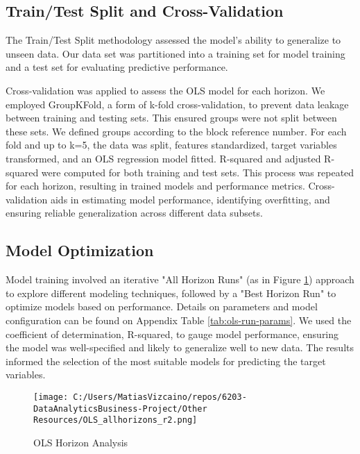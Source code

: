 \documentclass{article}
\begin{document}
\subsection{Train/Test Split and Cross-Validation}

The Train/Test Split methodology assessed the model's ability to generalize to unseen data. Our data set was partitioned into a training set for model training and a test set for evaluating predictive performance.

Cross-validation was applied to assess the OLS model for each horizon. We employed GroupKFold, a form of k-fold cross-validation, to prevent data leakage between training and testing sets. This ensured groups were not split between these sets. We defined groups according to the block reference number. For each fold and up to k=5, the data was split, features standardized, target variables transformed, and an OLS regression model fitted. R-squared and adjusted R-squared were computed for both training and test sets. This process was repeated for each horizon, resulting in trained models and performance metrics. Cross-validation aids in estimating model performance, identifying overfitting, and ensuring reliable generalization across different data subsets.

\subsection{Model Optimization}\label{sec:model-optimization}

Model training involved an iterative "All Horizon Runs" (as in Figure \ref{fig:ols-all-horizons}) approach to explore different modeling techniques, followed by a "Best Horizon Run" to optimize models based on performance. Details on parameters and model configuration can be found on Appendix Table \ref{tab:ols-run-params}. We used the coefficient of determination, R-squared, to gauge model performance, ensuring the model was well-specified and likely to generalize well to new data. The results informed the selection of the most suitable models for predicting the target variables.

\begin{figure}[htbp]
  \centering
  \texttt{[image: C:/Users/MatiasVizcaino/repos/6203-DataAnalyticsBusiness-Project/Other Resources/OLS\_allhorizons\_r2.png]}
  \caption{OLS Horizon Analysis}
  \label{fig:ols-all-horizons}
\end{figure}
\end{document}
